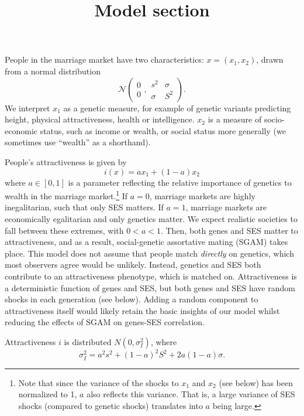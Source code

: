\documentclass[
]{article}
\title{Model section}
\author{}
\date{\vspace{-2.5em}}
\theoremstyle{definition}
\theoremstyle{definition}
\theoremstyle{definition}
\theoremstyle{definition}
\theoremstyle{remark}
\begin{document}
\maketitle

People in the marriage market have two characteristics:
\(x=\left( x_{1},x_{2}\right)\), drawn from a normal distribution
\[
\mathcal{N}
\left( 
\begin{array}{c}
0 \\ 
0%
\end{array}%
,%
\begin{array}{cc}
s^{2} & \sigma \\ 
\sigma & S^{2}%
\end{array}%
\right).
\]
We interpret \(x_1\) as a genetic measure, for example of genetic variants predicting
height, physical attractiveness, health or intelligence. \(x_2\) is a measure of
socio-economic status, such as income or wealth, or social status more generally
(we sometimes use ``wealth'' as a shorthand).

People's attractiveness is given by
\[
i\left( x\right) =ax_{1}+\left( 1-a\right) x_{2}
\]
where \(a \in [0, 1]\) is a parameter reflecting the relative importance of
genetics to wealth in the marriage market.\footnote{Note that since the variance of the shocks to \(x_1\) and \(x_2\)
  (see below) has been normalized to 1, \(a\) also reflects this variance. That
  is, a large variance of SES shocks (compared to genetic shocks) translates into
  \(a\) being large.} If \(a = 0\),
marriage markets are highly inegalitarian, such that only SES matters. If \(a =
1\), marriage markets are economically egalitarian and only genetics matter. We
expect realistic societies to fall between these extremes, with \(0 < a < 1\).
Then, both genes and SES matter to attractiveness, and as a result,
social-genetic assortative mating (SGAM) takes place. This model does not assume
that people match \emph{directly} on genetics, which most observers agree would be
unlikely. Instead, genetics and SES both contribute to an attractiveness phenotype,
which is matched on. Attractiveness is a deterministic function of genes and SES,
but both genes and SES have random shocks in each generation (see below). Adding
a random component to attractiveness itself would likely retain the basic insights
of our model whilst reducing the effects of SGAM on genes-SES correlation.

Attractiveness \(i\) is
distributed \(N(0,\sigma_{I}^{2})\), where
\[
\sigma _{I}^{2}=a^{2}s^{2}+\left( 1-a\right) ^{2}S^{2}+2a\left( 1-a\right)\sigma.
\]
\end{document}

